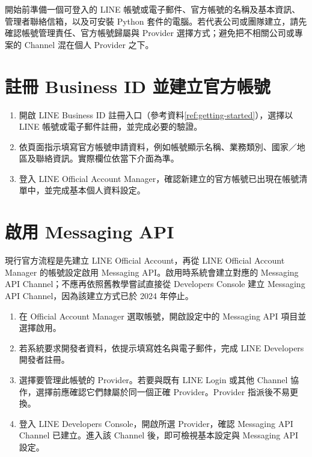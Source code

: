 \documentclass[a4paper,12pt]{report}
\begin{document}
開始前準備一個可登入的 LINE 帳號或電子郵件、官方帳號的名稱及基本資訊、管理者聯絡信箱，以及可安裝 Python 套件的電腦。若代表公司或團隊建立，請先確認帳號管理責任、官方帳號歸屬與 Provider 選擇方式；避免把不相關公司或專案的 Channel 混在個人 Provider 之下。

\section{註冊 Business ID 並建立官方帳號}

\begin{enumerate}
  \item 開啟 LINE Business ID 註冊入口（參考資料\ref{ref:getting-started}），選擇以 LINE 帳號或電子郵件註冊，並完成必要的驗證。
  \item 依頁面指示填寫官方帳號申請資料，例如帳號顯示名稱、業務類別、國家／地區及聯絡資訊。實際欄位依當下介面為準。
  \item 登入 LINE Official Account Manager，確認新建立的官方帳號已出現在帳號清單中，並完成基本個人資料設定。
\end{enumerate}

\section{啟用 Messaging API}

現行官方流程是先建立 LINE Official Account，再從 LINE Official Account Manager 的帳號設定啟用 Messaging API。啟用時系統會建立對應的 Messaging API Channel；不應再依照舊教學嘗試直接從 Developers Console 建立 Messaging API Channel，因為該建立方式已於 2024 年停止。

\begin{enumerate}
  \item 在 Official Account Manager 選取帳號，開啟設定中的 Messaging API 項目並選擇啟用。
  \item 若系統要求開發者資料，依提示填寫姓名與電子郵件，完成 LINE Developers 開發者註冊。
  \item 選擇要管理此帳號的 Provider。若要與既有 LINE Login 或其他 Channel 協作，選擇前應確認它們隸屬於同一個正確 Provider。Provider 指派後不易更換。
  \item 登入 LINE Developers Console，開啟所選 Provider，確認 Messaging API Channel 已建立。進入該 Channel 後，即可檢視基本設定與 Messaging API 設定。
\end{enumerate}
\end{document}
